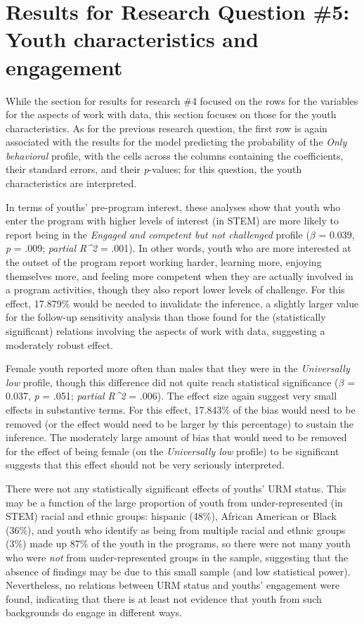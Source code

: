\documentclass[]{msu-thesis}
\theoremstyle{definition}
\theoremstyle{definition}
\theoremstyle{definition}
\theoremstyle{remark}
\begin{document}
\section{Results for Research Question \#5: Youth characteristics and
engagement}\label{results-for-research-question-5-youth-characteristics-and-engagement}

While the section for results for research \#4 focused on the rows for
the variables for the aspects of work with data, this section focuses on
those for the youth characteristics. As for the previous research
question, the first row is again associated with the results for the
model predicting the probability of the \emph{Only behavioral} profile,
with the cells across the columns containing the coefficients, their
standard errors, and their \emph{p}-values; for this question, the youth
characteristics are interpreted.

In terms of youths' pre-program interest, these analyses show that youth
who enter the program with higher levels of interest (in STEM) are more
likely to report being in the \emph{Engaged and competent but not
challenged} profile (\(\beta\) = 0.039, \emph{p} = .009; \emph{partial
R\^{}2} = .001). In other words, youth who are more interested at the
outset of the program report working harder, learning more, enjoying
themselves more, and feeling more competent when they are actually
involved in a program activities, though they also report lower levels
of challenge. For this effect, 17.879\% would be needed to invalidate
the inference, a slightly larger value for the follow-up sensitivity
analysis than those found for the (statistically significant) relations
involving the aspects of work with data, suggesting a moderately robust
effect.

Female youth reported more often than males that they were in the
\emph{Universally low} profile, though this difference did not quite
reach statistical significance (\(\beta\) = 0.037, \emph{p} = .051;
\emph{partial R\^{}2} = .006). The effect size again suggest very small
effects in substantive terms. For this effect, 17.843\% of the bias
would need to be removed (or the effect would need to be larger by this
percentage) to sustain the inference. The moderately large amount of
bias that would need to be removed for the effect of being female (on
the \emph{Universally low} profile) to be significant suggests that this
effect should not be very seriously interpreted.

There were not any statistically significant effects of youths' URM
status. This may be a function of the large proportion of youth from
under-represented (in STEM) racial and ethnic groups: hispanic (48\%),
African American or Black (36\%), and youth who identify as being from
multiple racial and ethnic groups (3\%) made up 87\% of the youth in the
programs, so there were not many youth who were \emph{not} from
under-represented groups in the sample, suggesting that the absence of
findings may be due to this small sample (and low statistical power).
Nevertheless, no relations between URM status and youths' engagement
were found, indicating that there is at least not evidence that youth
from such backgrounds do engage in different ways.
\end{document}
